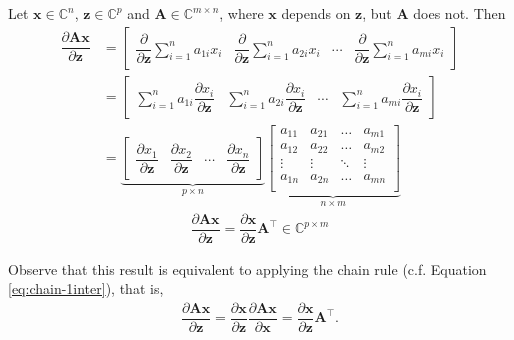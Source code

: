 \documentclass{article}
\newcommand{\trans}{\top}
\begin{document}
Let \(\mathbf{x} \in \mathbb{C}^{n}\), \(\mathbf{z} \in \mathbb{C}^{p}\) and \(\mathbf{A} \in \mathbb{C}^{m\times n}\), where \(\mathbf{x}\) depends on \(\mathbf{z}\), but \(\mathbf{A}\) does not. Then
\begin{align}
    \dfrac{\partial \mathbf{A}  \mathbf{x}}{\partial \mathbf{z}} & =
    \begin{bmatrix}
        \dfrac{\partial}{\partial \mathbf{z}}\sum_{i=1}^{n} a_{1i}x_i & \dfrac{\partial}{\partial \mathbf{z}}\sum_{i=1}^{n} a_{2i}x_i & \cdots & \dfrac{\partial}{\partial \mathbf{z}}\sum_{i=1}^{n} a_{mi}x_i
    \end{bmatrix} \\
    & = \begin{bmatrix}
        \sum_{i=1}^{n} a_{1i}\dfrac{\partial x_i}{\partial \mathbf{z}} & \sum_{i=1}^{n} a_{2i}\dfrac{\partial x_i}{\partial \mathbf{z}} & \cdots & \sum_{i=1}^{n} a_{mi}\dfrac{\partial x_i}{\partial \mathbf{z}}
    \end{bmatrix} \\
    & = \underbrace{\begin{bmatrix}
        \dfrac{\partial x_1}{\partial \mathbf{z}} & \dfrac{\partial x_2}{\partial \mathbf{z}} & \cdots & \dfrac{\partial x_n}{\partial \mathbf{z}}
    \end{bmatrix}}_{p \times n}
    \underbrace{\begin{bmatrix}
        a_{11} & a_{21} & \dots & a_{m1} \\
        a_{12} & a_{22} & \dots & a_{m2} \\
        \vdots & \vdots & \ddots & \vdots \\
        a_{1n} & a_{2n} & \dots & a_{mn} \\
    \end{bmatrix}}_{n \times m}
\end{align}
\begin{align}
    \boxed{\dfrac{\partial \mathbf{A}  \mathbf{x}}{\partial \mathbf{z}} = \dfrac{\partial \mathbf{x}}{\partial \mathbf{z}} \mathbf{A}^\trans \in \mathbb{C}^{p \times m}}
\end{align}

Observe that this result is equivalent to applying the chain rule (c.f. Equation \eqref{eq:chain-1inter}), that is,
\begin{align}
    \dfrac{\partial \mathbf{A}  \mathbf{x}}{\partial \mathbf{z}} = \dfrac{\partial \mathbf{x}}{\partial \mathbf{z}} \dfrac{\partial \mathbf{A}  \mathbf{x}}{\partial \mathbf{x}} = \dfrac{\partial \mathbf{x}}{\partial \mathbf{z}} \mathbf{A}^\trans.
\end{align}
\end{document}
